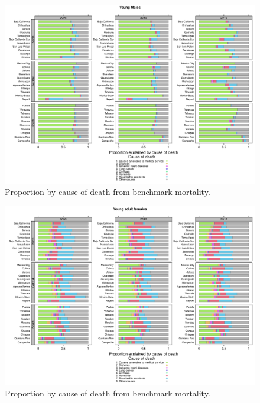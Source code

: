 \documentclass[11.5pt]{article}
\begin{document}
{\begin{figure}
\centering
\caption{Proportion by cause of death from benchmark mortality.}
\begin{center}
\includegraphics[scale=.45]{Figure_prop_ym.pdf}
\end{center}
\end{figure}


\begin{figure}
\centering
\caption{Proportion by cause of death from benchmark mortality.}
\begin{center}
\includegraphics[scale=.45]{Figure_prop_yaf.pdf}
\end{center}
\end{figure}


}
\end{document}
